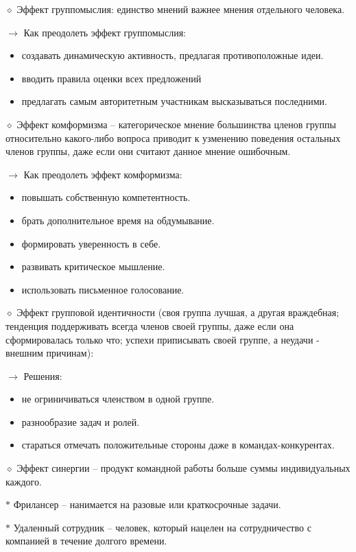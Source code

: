 \documentclass[12pt,a4paper]{report}
\begin{document}
\bigskip
$\diamond$ Эффект группомыслия: единство мнений важнее мнения отдельного человека.

\medskip 
$\rightarrow$ Как преодолеть эффект группомыслия:
\begin{itemize}
	\item создавать динамическую активность, предлагая противоположные идеи.
	\item вводить правила оценки всех предложений 
	\item предлагать самым авторитетным участникам высказываться последними.
\end{itemize}

\bigskip
$\diamond$ Эффект комформизма -- категорическое мнение большинства цленов группы относительно какого-либо вопроса приводит к узменению поведения остальных членов группы, даже если они считают данное мнение ошибочным.

\newpage
\medskip 
$\rightarrow$ Как преодолеть эффект комформизма:
\begin{itemize}
	\item повышать собственную компетентность.
	\item брать дополнительное время на обдумывание.
	\item формировать уверенность в себе.
	\item развивать критическое мышление.
	\item использовать письменное голосование.
\end{itemize}

\bigskip 
$\diamond$ Эффект групповой идентичности (своя группа лучшая, а другая враждебная; тенденция поддерживать всегда членов своей группы, даже если она сформировалась только что; успехи приписывать своей группе, а неудачи - внешним причинам):

\medskip
$\rightarrow$ Решения:
\begin{itemize}
	\item не огриничиваться членством в одной группе.
	\item разнообразие задач и ролей.
	\item стараться отмечать положительные стороны даже в командах-конкурентах.
\end{itemize}

\bigskip
$\diamond$  Эффект синергии -- продукт командной работы больше суммы индивидуальных каждого.

\bigskip 
$\ast$ Фрилансер -- нанимается на разовые или краткосрочные задачи.


\medskip
$\ast$ Удаленный сотрудник -- человек, который нацелен на сотрудничество с компанией в течение долгого времени.
\end{document}
